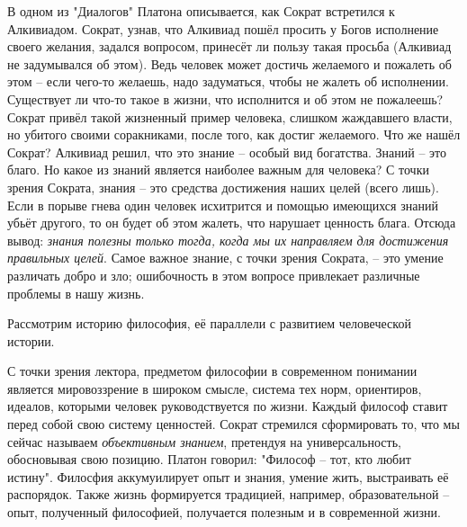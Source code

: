\documentclass[a4paper, 12pt]{article} %
\begin{document}
В одном из "Диалогов" Платона описывается, как Сократ встретился к Алкивиадом. Сократ, узнав, что Алкивиад пошёл просить у Богов исполнение своего желания, задался вопросом, принесёт ли пользу такая просьба (Алкивиад не задумывался об этом). Ведь человек может достичь желаемого и пожалеть об этом -- если чего-то желаешь, надо задуматься, чтобы не жалеть об исполнении. Существует ли что-то такое в жизни, что исполнится и об этом не пожалеешь? Сократ привёл такой жизненный пример человека, слишком жаждавшего власти, но убитого своими соракниками, после того, как достиг желаемого. Что же нашёл Сократ? Алкивиад решил, что это знание -- особый вид богатства. Знаний -- это благо. Но какое из знаний является наиболее важным для человека? С точки зрения Сократа, знания -- это средства достижения наших целей (всего лишь). Если в порыве гнева один человек исхитрится и помощью имеющихся знаний убьёт другого, то он будет об этом жалеть, что нарушает ценность блага. Отсюда вывод: \textit{знания полезны только тогда, когда мы их направляем для достижения правильных целей}. Самое важное знание, с точки зрения Сократа, -- это умение различать добро и зло; ошибочность в этом вопросе привлекает различные проблемы в нашу жизнь.

Рассмотрим историю философия, её параллели с развитием человеческой истории.

С точки зрения лектора, предметом философии в современном понимании является мировоззрение в широком смысле, система тех норм, ориентиров, идеалов, которыми человек руководствуется по жизни. Каждый философ ставит перед собой свою систему ценностей. Сократ стремился сформировать то, что мы сейчас называем \textit{объективным знанием}, претендуя на универсальность, обосновывая свою позицию. Платон говорил: "Философ -- тот, кто любит истину". Филосфия аккумуилирует опыт и знания, умение жить, выстраивать её распорядок. Также жизнь формируется традицией, например, образовательной -- опыт, полученный философией, получается полезным и в современной жизни.
\end{document}
